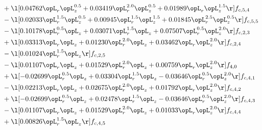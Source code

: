 \begin{alignat}{2}
& + \l[  0.04762 \opL_r \opL_z^{0.5} +  0.03419 \opL_r^{2.0} \opL_z^{0.5} +  0.01989 \opL_r \opL_z^{1.5}  \r] f_{c,5,4} \nonumber \\ 
& - \l[  0.02033 \opL_r^{1.5} \opL_z^{0.5} +  0.00945 \opL_r^{1.5} \opL_z^{1.5} +  0.01845 \opL_r^{2.5} \opL_z^{0.5}  \r] f_{c,5,5} \nonumber \\ 
& - \l[  0.10178 \opL_r^{0.5} \opL_z +  0.03071 \opL_r^{1.5} \opL_z +  0.07507 \opL_r^{0.5} \opL_z^{2.0}  \r] f_{c,2,3} \nonumber \\ 
& + \l[  0.03313 \opL_r \opL_z +  0.01230 \opL_r^{2.0} \opL_z +  0.03462 \opL_r \opL_z^{2.0}  \r] f_{c,2,4} \nonumber \\ 
& - \l[  0.01024 \opL_r^{1.5} \opL_z  \r] f_{c,2,5} \nonumber \\ 
& - \l[  0.01107 \opL_r \opL_z +  0.01529 \opL_r^{2.0} \opL_z +  0.00759 \opL_r \opL_z^{2.0}  \r] f_{4,0} \nonumber \\ 
& + \l[  -0.02699 \opL_r^{0.5} \opL_z +  0.03304 \opL_r^{1.5} \opL_z   -0.03646 \opL_r^{0.5} \opL_z^{2.0}  \r] f_{c,4,1} \nonumber \\ 
& - \l[  0.02213 \opL_r \opL_z +  0.02675 \opL_r^{2.0} \opL_z +  0.01792 \opL_r \opL_z^{2.0}  \r] f_{c,4,2} \nonumber \\ 
& + \l[  -0.02699 \opL_r^{0.5} \opL_z +  0.02478 \opL_r^{1.5} \opL_z   -0.03646 \opL_r^{0.5} \opL_z^{2.0}  \r] f_{c,4,3} \nonumber \\ 
& - \l[  0.01107 \opL_r \opL_z +  0.01529 \opL_r^{2.0} \opL_z +  0.01033 \opL_r \opL_z^{2.0}  \r] f_{c,4,4} \nonumber \\ 
& + \l[  0.00826 \opL_r^{1.5} \opL_z  \r] f_{c,4,5} \nonumber \\ 
\end{alignat} 


